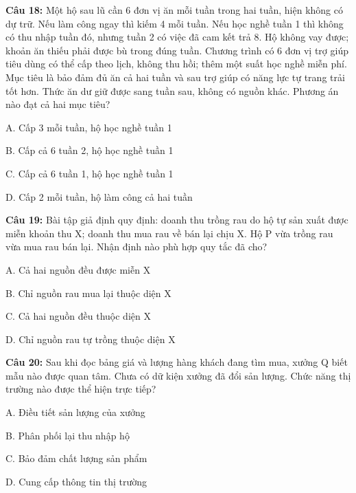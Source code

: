 \documentclass[12pt,a4paper]{article}
\begin{document}
\par\noindent\begin{minipage}{\linewidth}
\noindent\textbf{Câu 18:} Một hộ sau lũ cần 6 đơn vị ăn mỗi tuần trong hai tuần, hiện không có dự trữ. Nếu làm công ngay thì kiếm 4 mỗi tuần. Nếu học nghề tuần 1 thì không có thu nhập tuần đó, nhưng tuần 2 có việc đã cam kết trả 8. Hộ không vay được; khoản ăn thiếu phải được bù trong đúng tuần. Chương trình có 6 đơn vị trợ giúp tiêu dùng có thể cấp theo lịch, không thu hồi; thêm một suất học nghề miễn phí. Mục tiêu là bảo đảm đủ ăn cả hai tuần và sau trợ giúp có năng lực tự trang trải tốt hơn. Thức ăn dư giữ được sang tuần sau, không có nguồn khác. Phương án nào đạt cả hai mục tiêu?\par
\noindent A. Cấp 3 mỗi tuần, hộ học nghề tuần 1\par
\noindent B. Cấp cả 6 tuần 2, hộ học nghề tuần 1\par
\noindent C. Cấp cả 6 tuần 1, hộ học nghề tuần 1\par
\noindent D. Cấp 2 mỗi tuần, hộ làm công cả hai tuần\par
\end{minipage}\par\vspace{0.12cm}

\par\noindent\begin{minipage}{\linewidth}
\noindent\textbf{Câu 19:} Bài tập giả định quy định: doanh thu trồng rau do hộ tự sản xuất được miễn khoản thu X; doanh thu mua rau về bán lại chịu X. Hộ P vừa trồng rau vừa mua rau bán lại. Nhận định nào phù hợp quy tắc đã cho?\par
\noindent A. Cả hai nguồn đều được miễn X\par
\noindent B. Chỉ nguồn rau mua lại thuộc diện X\par
\noindent C. Cả hai nguồn đều thuộc diện X\par
\noindent D. Chỉ nguồn rau tự trồng thuộc diện X\par
\end{minipage}\par\vspace{0.12cm}

\par\noindent\begin{minipage}{\linewidth}
\noindent\textbf{Câu 20:} Sau khi đọc bảng giá và lượng hàng khách đang tìm mua, xưởng Q biết mẫu nào được quan tâm. Chưa có dữ kiện xưởng đã đổi sản lượng. Chức năng thị trường nào được thể hiện trực tiếp?\par
\noindent A. Điều tiết sản lượng của xưởng\par
\noindent B. Phân phối lại thu nhập hộ\par
\noindent C. Bảo đảm chất lượng sản phẩm\par
\noindent D. Cung cấp thông tin thị trường\par
\end{minipage}\par\vspace{0.12cm}
\end{document}
